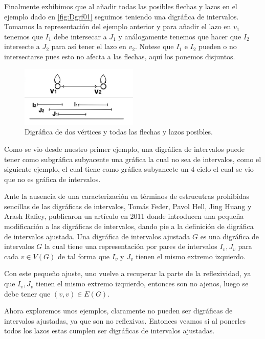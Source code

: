 Finalmente exhibimos que al añadir todas las posibles flechas y lazos en el ejemplo dado en \cref{fig:Dgrf01} seguimos teniendo una digráfica de intervalos. Tomamos la representación del ejemplo anterior y para añadir el lazo en $v_1$ tenemos que $I_1$ debe intersecar a $J_1$ y análogamente tenemos que hacer que $I_2$ intersecte a $J_2$ para así tener el lazo en $v_2$. Notese que $I_1$ e $I_2$ pueden o no intersectarse pues esto no afecta a las flechas, aquí los ponemos disjuntos.

\begin{figure}[H]
  \centering
  \includegraphics[width=0.5\textwidth]{recursos/capturas/Digraf4.jpg}
  \caption{Digráfica de dos vértices y todas las flechas y lazos posibles.}
  \label{fig:Dgrf04}
\end{figure}
 
Como se vio desde nuestro primer ejemplo, una digráfica de intervalos puede tener como subgráfica subyacente una gráfica la cual no sea de intervalos, como el siguiente ejemplo, el cual tiene como gráfica subyancete un 4-ciclo el cual se vio que no es gráfica de intervalos. 

Ante la ausencia de una caracterización en términos de estrucutras prohibidas sencillas de las digráficas de intervalos, Tomás Feder, Pavol Hell, Jing Huang y Arash Rafiey, publicaron un artículo en 2011 donde introducen una pequeña modificación a las digráficas de intervalos, dando pie a la definición de digráfica de intervalos ajustada. Una digráfica de intervalos ajustada $G$ es una digráfica de intervalos $G$ la cual tiene una representación por pares de intervalos $I_v, J_v$ para cada $v\in V(G)$ de tal forma que $I_v$ y $J_v$ tienen el mismo extremo izquierdo. 

Con este pequeño ajuste, uno vuelve a recuperar la parte de la reflexividad, ya que $I_v,J_v$ tienen el mismo extremo izquierdo, entonces son no ajenos, luego se debe tener que $(v,v)\in E(G)$.

Ahora exploremos unos ejemplos, claramente  no pueden ser digráficas de intervalos ajustadas, ya que son no reflexivas. Entonces veamos si al ponerles todos los lazos estas cumplen ser digráficas de intervalos ajustadas.

